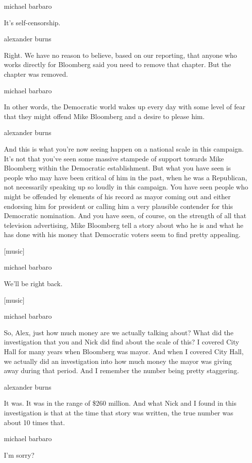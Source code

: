 michael barbaro

It's self-censorship.

alexander burns

Right. We have no reason to believe, based on our reporting, that anyone
who works directly for Bloomberg said you need to remove that chapter.
But the chapter was removed.

michael barbaro

In other words, the Democratic world wakes up every day with some level
of fear that they might offend Mike Bloomberg and a desire to please
him.

alexander burns

And this is what you're now seeing happen on a national scale in this
campaign. It's not that you've seen some massive stampede of support
towards Mike Bloomberg within the Democratic establishment. But what you
have seen is people who may have been critical of him in the past, when
he was a Republican, not necessarily speaking up so loudly in this
campaign. You have seen people who might be offended by elements of his
record as mayor coming out and either endorsing him for president or
calling him a very plausible contender for this Democratic nomination.
And you have seen, of course, on the strength of all that television
advertising, Mike Bloomberg tell a story about who he is and what he has
done with his money that Democratic voters seem to find pretty
appealing.

{[}music{]}

michael barbaro

We'll be right back.

{[}music{]}

michael barbaro

So, Alex, just how much money are we actually talking about? What did
the investigation that you and Nick did find about the scale of this? I
covered City Hall for many years when Bloomberg was mayor. And when I
covered City Hall, we actually did an investigation into how much money
the mayor was giving away during that period. And I remember the number
being pretty staggering.

alexander burns

It was. It was in the range of \$260 million. And what Nick and I found
in this investigation is that at the time that story was written, the
true number was about 10 times that.

michael barbaro

I'm sorry?

